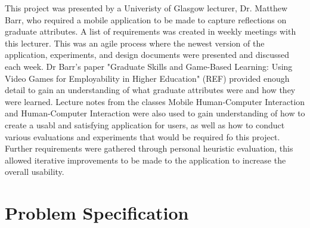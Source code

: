 \documentclass{l4proj}
\begin{document}
This project was presented by a Univeristy of Glasgow lecturer, Dr. Matthew Barr, who required a mobile application to be made 
to capture reflections on graduate attributes. A list of requirements was created in weekly meetings with this lecturer.
This was an agile process where the newest version of the application, experiments, and design documents were presented
and discussed each week. Dr Barr's paper "Graduate Skills and Game-Based Learning: Using Video Games for Employability in Higher 
Education" (REF) provided enough detail to gain an understanding of what graduate attributes were and how they were learned. 
Lecture notes from the classes Mobile Human-Computer Interaction and Human-Computer Interaction were also used to gain understanding
of how to create a usabl and satisfying application for users, as well as how to conduct various evaluations and experiments that would
be required fo this project.
Further requirements were gathered through personal heuristic evaluation, this allowed iterative improvements to be made to the
application to increase the overall usability.

\section{Problem Specification}
\end{document}
